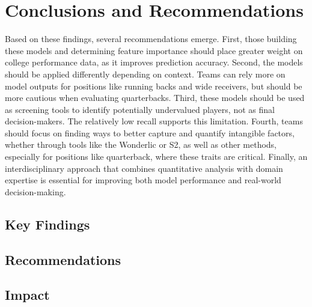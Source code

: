 \documentclass[11pt]{article}
\begin{document}

\section{Conclusions and Recommendations}
Based on these findings, several recommendations emerge. First, those building these models and determining feature importance should place greater weight on college performance data, as it improves prediction accuracy. Second, the models should be applied differently depending on context. Teams can rely more on model outputs for positions like running backs and wide receivers, but should be more cautious when evaluating quarterbacks. Third, these models should be used as screening tools to identify potentially undervalued players, not as final decision-makers. The relatively low recall supports this limitation. Fourth, teams should focus on finding ways to better capture and quantify intangible factors, whether through tools like the Wonderlic or S2, as well as other methods, especially for positions like quarterback, where these traits are critical. Finally, an interdisciplinary approach that combines quantitative analysis with domain expertise is essential for improving both model performance and real-world decision-making.


\subsection{Key Findings}


\subsection{Recommendations}


\subsection{Impact}

\end{document}
